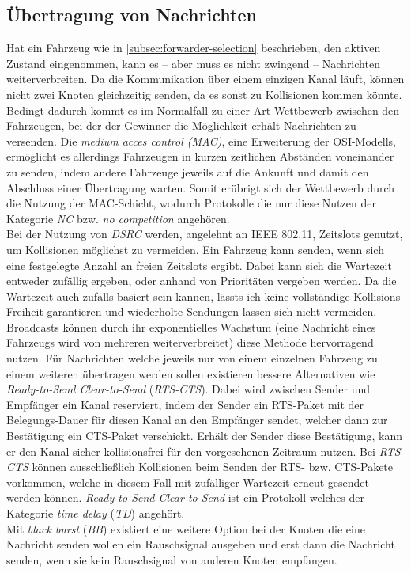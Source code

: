 \documentclass[english,runningheads,a4paper]{llncs}[2018/03/10]
\begin{document}
\subsection{Übertragung von Nachrichten}
Hat ein Fahrzeug wie in \ref{subsec:forwarder-selection} beschrieben, den aktiven Zustand eingenommen, kann es – aber muss es nicht zwingend – Nachrichten weiterverbreiten.
Da die Kommunikation über einem einzigen Kanal läuft, können nicht zwei Knoten gleichzeitig senden, da es sonst zu Kollisionen kommen könnte.
Bedingt dadurch kommt es im Normalfall zu einer Art Wettbewerb zwischen den Fahrzeugen, bei der der Gewinner die Möglichkeit erhält Nachrichten zu versenden.
Die \textit{medium acces control (MAC)}, eine Erweiterung der OSI-Modells, ermöglicht es allerdings Fahrzeugen in kurzen zeitlichen Abständen voneinander zu senden, indem andere Fahrzeuge jeweils auf die Ankunft und damit den Abschluss einer Übertragung warten.
Somit erübrigt sich der Wettbewerb durch die Nutzung der MAC-Schicht, wodurch Protokolle die nur diese Nutzen der Kategorie \textit{NC} bzw. \textit{no competition} angehören.\\
Bei der Nutzung von \textit{DSRC} werden, angelehnt an IEEE 802.11, Zeitslots genutzt, um Kollisionen möglichst zu vermeiden.
Ein Fahrzeug kann senden, wenn sich eine festgelegte Anzahl an freien Zeitslots ergibt.
Dabei kann sich die Wartezeit entweder zufällig ergeben, oder anhand von Prioritäten vergeben werden.
Da die Wartezeit auch zufalls-basiert sein kannen, lässts ich keine vollständige Kollisions-Freiheit garantieren und wiederholte Sendungen lassen sich nicht vermeiden.
Broadcasts können durch ihr exponentielles Wachstum (eine Nachricht eines Fahrzeugs wird von mehreren weiterverbreitet) diese Methode hervorragend nutzen.
Für Nachrichten welche jeweils nur von einem einzelnen Fahrzeug zu einem weiteren übertragen werden sollen existieren bessere Alternativen wie \textit{Ready-to-Send Clear-to-Send} (\textit{RTS-CTS}).
Dabei wird zwischen Sender und Empfänger ein Kanal reserviert, indem der Sender ein RTS-Paket mit der Belegungs-Dauer für diesen Kanal an den Empfänger sendet, welcher dann zur Bestätigung ein CTS-Paket verschickt.
Erhält der Sender diese Bestätigung, kann er den Kanal sicher kollisionsfrei für den vorgesehenen Zeitraum nutzen.
Bei \textit{RTS-CTS} können ausschließlich Kollisionen beim Senden der RTS- bzw. CTS-Pakete vorkommen, welche in diesem Fall mit zufälliger Wartezeit erneut gesendet werden können.
\textit{Ready-to-Send Clear-to-Send} ist ein Protokoll welches der Kategorie \textit{time delay} (\textit{TD}) angehört.\\
Mit \textit{black burst} (\textit{BB}) existiert eine weitere Option bei der Knoten die eine Nachricht senden wollen ein Rauschsignal ausgeben und erst dann die Nachricht senden, wenn sie kein Rauschsignal von anderen Knoten empfangen.
\end{document}
